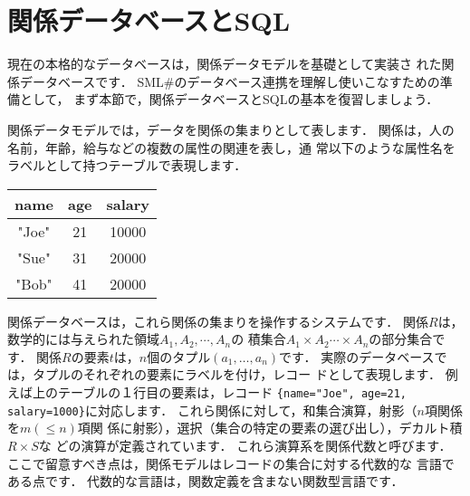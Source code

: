 \documentclass{jbook}
\newif\ifjp
\newcommand{\txt}[2]{#1}
\newcommand{\smlsharp}{SML\#}
\begin{document}
\section{\txt{関係データベースとSQL}{Relational databases and SQL}}
\label{sec:tutorialRelationalModel}

\ifjp%
	現在の本格的なデータベースは，関係データモデルを基礎として実装さ
れた関係データベースです．
	\smlsharp{}のデータベース連携を理解し使いこなすための準備として，
まず本節で，関係データベースとSQLの基本を復習しましょう．

	関係データモデルでは，データを関係の集まりとして表します．
	関係は，人の名前，年齢，給与などの複数の属性の関連を表し，通
常以下のような属性名をラベルとして持つテーブルで表現します．

\begin{center}
\begin{tabular}{|c|c|c|}
\hline
name & age & salary
\\\hline
"Joe" & 21 & 10000
\\\hline
"Sue" & 31 & 20000
\\\hline
"Bob" & 41 & 20000
\\\hline
\end{tabular}
\end{center}

	関係データベースは，これら関係の集まりを操作するシステムです．
	関係$R$は，数学的には与えられた領域$A_1,A_2,\cdots,A_n$の
積集合$A_1\times A_2 \cdots \times A_n$の部分集合です．
	関係$R$の要素$t$は，$n$個のタプル$(a_1,\ldots,a_n)$です．
	実際のデータベースでは，タプルのそれぞれの要素にラベルを付け，レコー
ドとして表現します．
	例えば上のテーブルの１行目の要素は，レコード
{\tt \{name="Joe", age=21, salary=1000\}}に対応します．
	これら関係に対して，和集合演算，射影（$n$項関係を$m (\le n)$項関
係に射影），選択（集合の特定の要素の選び出し），デカルト積 $R\times S$な
どの演算が定義されています．
	これら演算系を関係代数と呼びます．
	ここで留意すべき点は，関係モデルはレコードの集合に対する代数的な
言語である点です．
	代数的な言語は，関数定義を含まない関数型言語です．
\end{document}
